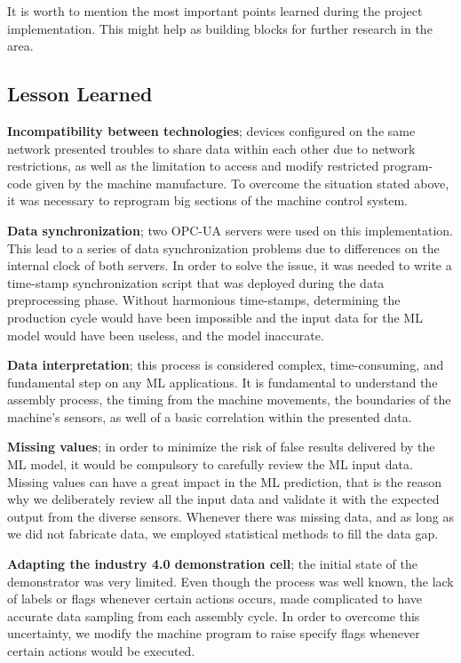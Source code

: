\documentclass[5p,times,procedia]{elsarticle}
\begin{document}
It is worth to mention the most important points learned during the project implementation. This might help as building blocks for further research in the area.

\subsection{Lesson Learned} %

\textbf{Incompatibility between technologies}; devices configured on the same network presented troubles to share data within each other due to network restrictions, as well as the limitation to access and modify restricted program-code given by the machine manufacture. 
To overcome the situation stated above, it was necessary to reprogram big sections of the machine control system.

\textbf{Data synchronization}; two OPC-UA servers were used on this implementation. This lead to a series of data synchronization problems due to differences on the internal clock of both servers.
In order to solve the issue, it was needed to write a time-stamp synchronization script that was deployed during the data preprocessing phase. Without harmonious time-stamps, determining the production cycle would have been impossible and the input data for the ML model would have been useless, and the model inaccurate. 

\textbf{Data interpretation}; this process is considered complex, time-consuming, and fundamental step on any ML applications. It is fundamental to understand the assembly process, the timing from the machine movements, the boundaries of the machine's sensors, as well of a basic correlation within the presented data.

\textbf{Missing values}; in order to minimize the risk of false results delivered by the ML model, it would be compulsory to carefully review the ML input data. Missing values can have a great impact in the ML prediction, that is the reason why we deliberately review all the input data and validate it with the expected output from the diverse sensors. Whenever there was missing data, and as long as we did not fabricate data, we employed statistical methods to fill the data gap.

\textbf{Adapting the industry 4.0 demonstration cell}; the initial state of the demonstrator was very limited. Even though the process was well known, the lack of labels or flags whenever certain actions occurs, made complicated to have accurate data sampling from each assembly cycle. In order to overcome this uncertainty, we modify the machine program to raise specify flags whenever certain actions would be executed.
\end{document}
